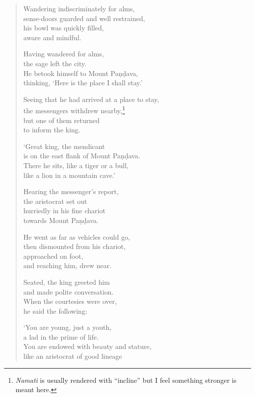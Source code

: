\documentclass[12pt,openany]{book}%
\begin{document}
\begin{verse}
Wandering indiscriminately for alms, \\
sense-doors guarded and well restrained, \\
his bowl was quickly filled, \\
aware and mindful. 

Having wandered for alms, \\
the sage left the city. \\
He betook himself to Mount \textsanskrit{Paṇḍava}, \\
thinking, ‘Here is the place I shall stay.’ 

Seeing that he had arrived at a place to stay, \\
the messengers withdrew nearby,\footnote{\textit{Namati} is usually rendered with “incline” but I feel something stronger is meant here. } \\
but one of them returned \\
to inform the king. 

‘Great king, the mendicant \\
is on the east flank of Mount \textsanskrit{Paṇḍava}. \\
There he sits, like a tiger or a bull, \\
like a lion in a mountain cave.’ 

Hearing the messenger’s report, \\
the aristocrat set out \\
hurriedly in his fine chariot \\
towards Mount \textsanskrit{Paṇḍava}. 

He went as far as vehicles could go, \\
then dismounted from his chariot, \\
approached on foot, \\
and reaching him, drew near. 

Seated, the king greeted him \\
and made polite conversation. \\
When the courtesies were over, \\
he said the following: 

‘You are young, just a youth, \\
a lad in the prime of life. \\
You are endowed with beauty and stature, \\
like an aristocrat of good lineage 


\end{verse}
\end{document}

